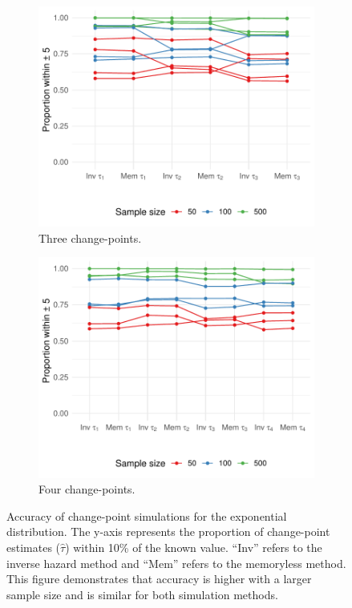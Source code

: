 \begin{figure}[ht]
     \begin{subfigure}[b]{0.45\textwidth}
         \centering
         \includegraphics[width=\textwidth]{exp3_plplot.pdf}
         \caption{Three change-points.}
         \label{fig:exp3plplot}
     \end{subfigure}
     \hfill
     \begin{subfigure}[b]{0.45\textwidth}
         \centering
         \includegraphics[width=\textwidth]{exp4_plplot.pdf}
         \caption{Four change-points.}
         \label{fig:exp4plplot}
     \end{subfigure}
    \caption{Accuracy of change-point simulations for the exponential distribution. The y-axis represents the proportion of change-point estimates ($\hat{\tau}$) within 10\% of the known value. ``Inv'' refers to the inverse hazard method and ``Mem'' refers to the memoryless method. This figure demonstrates that accuracy is higher with a larger sample size and is similar for both simulation methods.}
    \label{fig:expplplots}
\end{figure}


